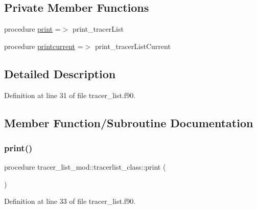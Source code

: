\subsection*{Private Member Functions}
\begin{DoxyCompactItemize}
\item 
procedure \mbox{\hyperlink{structtracer__list__mod_1_1tracerlist__class_a38847507e6b4065e39baacbbb807b1c4}{print}} =$>$ print\+\_\+tracer\+List
\item 
procedure \mbox{\hyperlink{structtracer__list__mod_1_1tracerlist__class_a1a4b6ead3ad318d3bf510064de21408a}{printcurrent}} =$>$ print\+\_\+tracer\+List\+Current
\end{DoxyCompactItemize}


\subsection{Detailed Description}


Definition at line 31 of file tracer\+\_\+list.\+f90.



\subsection{Member Function/\+Subroutine Documentation}
\mbox{\label{structtracer__list__mod_1_1tracerlist__class_a38847507e6b4065e39baacbbb807b1c4}} 
\subsubsection{\texorpdfstring{print()}{print()}}
{\footnotesize\ttfamily procedure tracer\+\_\+list\+\_\+mod\+::tracerlist\+\_\+class\+::print (\begin{DoxyParamCaption}{ }\end{DoxyParamCaption})\hspace{0.3cm}{\ttfamily [private]}}



Definition at line 33 of file tracer\+\_\+list.\+f90.

\mbox{\label{structtracer__list__mod_1_1tracerlist__class_a1a4b6ead3ad318d3bf510064de21408a}} 
